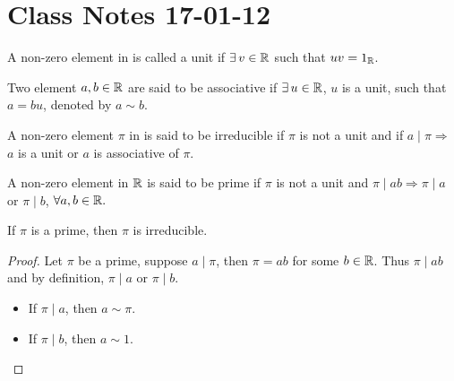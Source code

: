 \documentclass{mynotes}
\begin{document}
\section{Class Notes 17-01-12}\label{PIDUFD}
\begin{definition}
A non-zero element in \R{} is called a unit if $\exists\, v\in \mathbb{R}$ such that $uv=1_{\mathbb{R}}$.
\end{definition}
\begin{definition}
Two element $a,b \in\mathbb{R}$ are said to be associative if $\exists\, u\in\mathbb{R}$, $u$ is a unit, such that $a=bu$, denoted by $a\sim b$.
\end{definition}
\begin{definition}
A non-zero element $\pi$ in \R{} is said to be irreducible if $\pi$ is not a unit and if $a\mid \pi\Rightarrow$ $a$ is a unit or $a$ is associative of $\pi$.
\end{definition}
\begin{definition}
A non-zero element in $\mathbb{R}$ is said to be prime if $\pi$ is not a unit and $\pi\mid  ab\Rightarrow \pi\mid a$ or $\pi\mid b$, $\forall a,b\in\mathbb{R}.$
\end{definition}
\begin{proposition}
If $\pi$ is a prime, then $\pi$ is irreducible.
\end{proposition}
\begin{proof}
Let $\pi$ be a prime, suppose $a\mid \pi$, then $\pi=ab$ for some $b\in\mathbb{R}$. Thus $\pi\mid ab$ and by definition, $\pi\mid a$ or $\pi\mid b$.
\begin{itemize}
\item If $\pi\mid a$, then $a\sim \pi$.
\item If $\pi\mid b$, then $a\sim 1$.
\end{itemize}
\end{proof}
\end{document}
